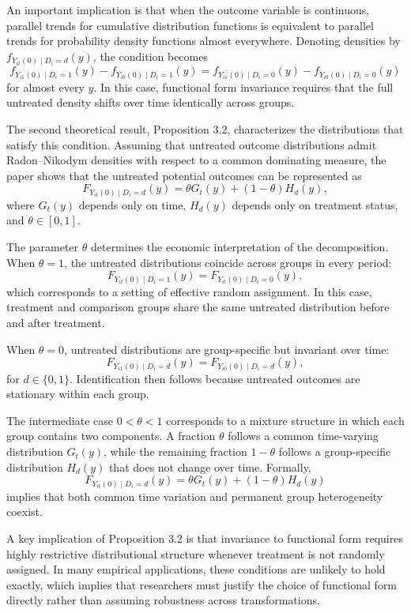 \documentclass[12pt]{article}
\theoremstyle{remark}
\begin{document}
An important implication is that when the outcome variable is continuous, parallel trends for cumulative distribution functions is equivalent to parallel trends for probability density functions almost everywhere. Denoting densities by \(f_{Y_{it}(0)\mid D_i=d}(y)\), the condition becomes
\[
f_{Y_{i1}(0)\mid D_i=1}(y)-f_{Y_{i0}(0)\mid D_i=1}(y)
=
f_{Y_{i1}(0)\mid D_i=0}(y)-f_{Y_{i0}(0)\mid D_i=0}(y)
\]
for almost every \(y\). In this case, functional form invariance requires that the full untreated density shifts over time identically across groups.

The second theoretical result, Proposition 3.2, characterizes the distributions that satisfy this condition. Assuming that untreated outcome distributions admit Radon--Nikodym densities with respect to a common dominating measure, the paper shows that the untreated potential outcomes can be represented as
\[
F_{Y_{it}(0)\mid D_i=d}(y)=\theta G_t(y)+(1-\theta)H_d(y),
\]
where \(G_t(y)\) depends only on time, \(H_d(y)\) depends only on treatment status, and \(\theta \in [0,1]\).

The parameter \(\theta\) determines the economic interpretation of the decomposition. When \(\theta=1\), the untreated distributions coincide across groups in every period:
\[
F_{Y_{it}(0)\mid D_i=1}(y)=F_{Y_{it}(0)\mid D_i=0}(y),
\]
which corresponds to a setting of effective random assignment. In this case, treatment and comparison groups share the same untreated distribution before and after treatment.

When \(\theta=0\), untreated distributions are group-specific but invariant over time:
\[
F_{Y_{i1}(0)\mid D_i=d}(y)=F_{Y_{i0}(0)\mid D_i=d}(y),
\]
for \(d \in \{0,1\}\). Identification then follows because untreated outcomes are stationary within each group.

The intermediate case \(0<\theta<1\) corresponds to a mixture structure in which each group contains two components. A fraction \(\theta\) follows a common time-varying distribution \(G_t(y)\), while the remaining fraction \(1-\theta\) follows a group-specific distribution \(H_d(y)\) that does not change over time. Formally,
\[
F_{Y_{it}(0)\mid D_i=d}(y)=\theta G_t(y)+(1-\theta)H_d(y)
\]
implies that both common time variation and permanent group heterogeneity coexist.

A key implication of Proposition 3.2 is that invariance to functional form requires highly restrictive distributional structure whenever treatment is not randomly assigned. In many empirical applications, these conditions are unlikely to hold exactly, which implies that researchers must justify the choice of functional form directly rather than assuming robustness across transformations.
\end{document}
